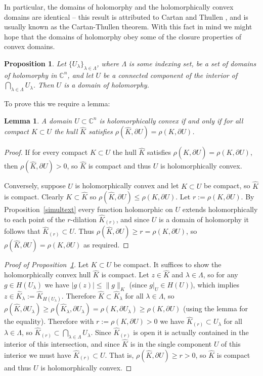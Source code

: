 \documentclass[11pt,a4paper, final, twoside]{article}
\newtheorem{lemma}[theorem]{Lemma}
\newtheorem{proposition}[theorem]{Proposition}
\numberwithin{equation}{section}
\newcommand{\C}{\mathbb C}
\newcommand{\bd}{\partial}
\newcommand{\pmetric}{\rho}
\newcommand{\hol}{H}
\newcommand{\dil}[2]{#1_{(#2)}}
\begin{document}
In particular, the domains of holomorphy and the holomorphically convex domains are identical -- this result is attributed to Cartan and Thullen \cite{cartanthullen}, and is usually known as the Cartan-Thullen
theorem. With this fact in mind we might hope that the domains of holomorphy obey some of the closure properties
of convex domains.
\begin{proposition}
\label{intscthol}
Let $\{U_\lambda\}_{\lambda\in\Lambda}$, where $\Lambda$ is some indexing set, be a set of domains of holomorphy in $\C^n$, and let $U$ be a connected component of the interior of 
$\bigcap_{\lambda\in\Lambda} U_\lambda$. Then $U$ is a domain of holomorphy.
\end{proposition}
To prove this we require a lemma:
\begin{lemma}
\label{hulldist}
A domain $U\subset\C^n$ is holomorphically convex if and only if for all compact $K\subset U$ the hull $\hat K$ satisfies $\pmetric(\hat K,\bd U)=\pmetric(K,\bd U)$.
\end{lemma}
\begin{proof}
If for every compact $K\subset U$ the hull $\hat K$ satisfies $\pmetric(\hat K,\bd U)=\pmetric(K,\bd U)$, then $\pmetric(\hat K,\bd U)>0$, so $\hat K$ is compact
and thus $U$ is holomorphically convex.

Conversely, suppose $U$ is holomorphically convex and let $K\subset U$ be compact, so $\hat K$ is compact. Clearly $K\subset\hat K$ so $\pmetric(\hat K,\bd U)\leq \pmetric(K,\bd U)$. 
Let $r:=\pmetric(K,\bd U)$. By Proposition~\ref{simultext} every function holomorphic on $U$ extends holomorphically
to each point of the $r$-dilation $\dil{\hat K}{r}$, and since $U$ is a domain of holomorphy it follows that $\dil{\hat K}{r}\subset U$. Thus $\pmetric(\hat K,\bd U)\geq r=\pmetric(K,\bd U)$,
so $\pmetric(\hat K,\bd U)=\pmetric(K,\bd U)$ as required.
\end{proof}
\begin{proof}[Proof of Proposition~\ref{intscthol}]
Let $K\subset U$ be compact. It suffices to show the holomorphically convex hull $\hat K$ is compact. 
Let $z\in\hat K$ and $\lambda\in\Lambda$, so for any $g\in\hol(U_\lambda)$ we have $|g(z)|\leq \|g\|_K$ (since $g\big|_U\in\hol(U)$), which implies $z\in\hat K_\lambda:=\hat K_{\hol(U_\lambda)}$.
Therefore $\hat K\subset\hat K_\lambda$ for all $\lambda\in\Lambda$, so
$\pmetric(\hat K,\bd U_\lambda)\geq \pmetric(\hat K_\lambda,\bd U_\lambda)=\pmetric(K,\bd U_\lambda)\geq \pmetric(K,\bd U)$ (using the lemma for the equality). Therefore
with $r:=\pmetric(K,\bd U)>0$ we have $\dil{\hat K}{r}\subset U_\lambda$ for all $\lambda\in\Lambda$, so $\dil{\hat K}{r}\subset \bigcap_{\lambda\in\Lambda} U_\lambda$.
Since $\dil{\hat K}{r}$ is open it is actually contained in the interior of this intersection, and since $\hat K$ is in the single component $U$ of this interior
we must have $\dil{\hat K}{r}\subset U$. That is, $\pmetric(\hat K,\bd U)\geq r>0$, so $\hat K$ is compact and thus $U$ is holomorphically convex.
\end{proof}
\end{document}
